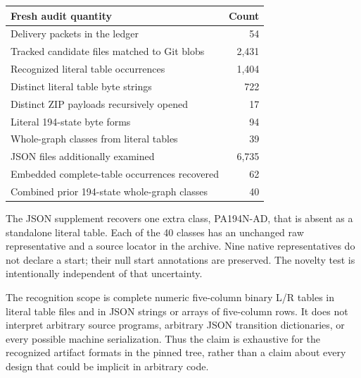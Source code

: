 \begin{center}\small
\begin{tabular}{lr}
\toprule Fresh audit quantity & Count\\\midrule
Delivery packets in the ledger & 54\\
Tracked candidate files matched to Git blobs & 2,431\\
Recognized literal table occurrences & 1,404\\
Distinct literal table byte strings & 722\\
Distinct ZIP payloads recursively opened & 17\\
Literal 194-state byte forms & 94\\
Whole-graph classes from literal tables & 39\\
JSON files additionally examined & 6,735\\
Embedded complete-table occurrences recovered & 62\\
Combined prior 194-state whole-graph classes & 40\\
\bottomrule\end{tabular}\end{center}
The JSON supplement recovers one extra class, PA194N-AD, that is absent
as a standalone literal table. Each of the 40 classes has an unchanged
raw representative and a source locator in the archive. Nine native
representatives do not declare a start; their null start annotations are
preserved. The novelty test is intentionally independent of that uncertainty.

The recognition scope is complete numeric five-column binary L/R tables
in literal table files and in JSON strings or arrays of five-column rows.
It does not interpret arbitrary source programs, arbitrary JSON transition
dictionaries, or every possible machine serialization. Thus the claim is
exhaustive for the recognized artifact formats in the pinned tree, rather
than a claim about every design that could be implicit in arbitrary code.
